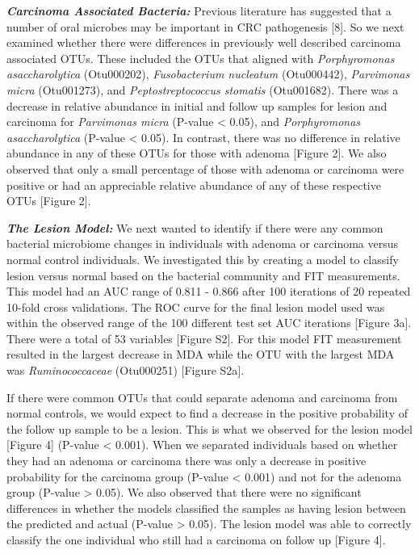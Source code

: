 \documentclass[12pt,]{article}
\begin{document}
\textbf{\emph{Carcinoma Associated Bacteria:}} Previous literature has
suggested that a number of oral microbes may be important in CRC
pathogenesis {[}8{]}. So we next examined whether there were differences
in previously well described carcinoma associated OTUs. These included
the OTUs that aligned with \emph{Porphyromonas asaccharolytica}
(Otu000202), \emph{Fusobacterium nucleatum} (Otu000442),
\emph{Parvimonas micra} (Otu001273), and \emph{Peptostreptococcus
stomatis} (Otu001682). There was a decrease in relative abundance in
initial and follow up samples for lesion and carcinoma for
\emph{Parvimonas micra} (P-value \textless{} 0.05), and
\emph{Porphyromonas asaccharolytica} (P-value \textless{} 0.05). In
contrast, there was no difference in relative abundance in any of these
OTUs for those with adenoma {[}Figure 2{]}. We also observed that only a
small percentage of those with adenoma or carcinoma were positive or had
an appreciable relative abundance of any of these respective OTUs
{[}Figure 2{]}.

\textbf{\emph{The Lesion Model:}} We next wanted to identify if there
were any common bacterial microbiome changes in individuals with adenoma
or carcinoma versus normal control individuals. We investigated this by
creating a model to classify lesion versus normal based on the bacterial
community and FIT measurements. This model had an AUC range of 0.811 -
0.866 after 100 iterations of 20 repeated 10-fold cross validations. The
ROC curve for the final lesion model used was within the observed range
of the 100 different test set AUC iterations {[}Figure 3a{]}. There were
a total of 53 variables {[}Figure S2{]}. For this model FIT measurement
resulted in the largest decrease in MDA while the OTU with the largest
MDA was \emph{Ruminococcaceae} (Otu000251) {[}Figure S2a{]}.

If there were common OTUs that could separate adenoma and carcinoma from
normal controls, we would expect to find a decrease in the positive
probability of the follow up sample to be a lesion. This is what we
observed for the lesion model {[}Figure 4{]} (P-value \textless{}
0.001). When we separated individuals based on whether they had an
adenoma or carcinoma there was only a decrease in positive probability
for the carcinoma group (P-value \textless{} 0.001) and not for the
adenoma group (P-value \textgreater{} 0.05). We also observed that there
were no significant differences in whether the models classified the
samples as having lesion between the predicted and actual (P-value
\textgreater{} 0.05). The lesion model was able to correctly classify
the one individual who still had a carcinoma on follow up {[}Figure
4{]}.
\end{document}
